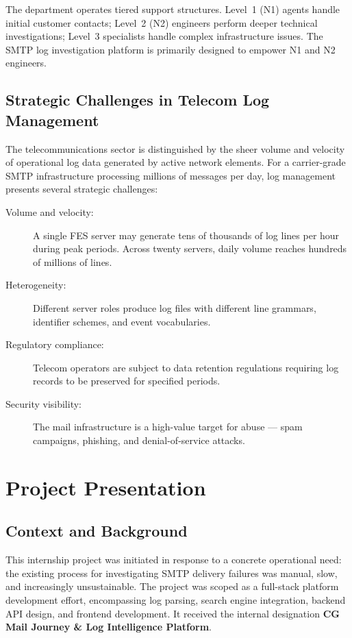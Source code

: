 \documentclass[12pt,a4paper,oneside]{report}
\begin{document}
The department operates tiered support structures.
Level~1 (N1) agents handle initial customer contacts; Level~2 (N2) engineers perform deeper technical investigations; Level~3 specialists handle complex infrastructure issues.
The SMTP log investigation platform is primarily designed to empower N1 and N2 engineers.

\subsection{Strategic Challenges in Telecom Log Management}

The telecommunications sector is distinguished by the sheer volume and velocity of operational log data generated by active network elements.
For a carrier-grade SMTP infrastructure processing millions of messages per day, log management presents several strategic challenges:

\begin{description}
  \item[Volume and velocity:] A single FES server may generate tens of thousands of log lines per hour during peak periods. Across twenty servers, daily volume reaches hundreds of millions of lines.
  \item[Heterogeneity:] Different server roles produce log files with different line grammars, identifier schemes, and event vocabularies.
  \item[Regulatory compliance:] Telecom operators are subject to data retention regulations requiring log records to be preserved for specified periods.
  \item[Security visibility:] The mail infrastructure is a high-value target for abuse --- spam campaigns, phishing, and denial-of-service attacks.
\end{description}

\section{Project Presentation}

\subsection{Context and Background}

This internship project was initiated in response to a concrete operational need: the existing process for investigating SMTP delivery failures was manual, slow, and increasingly unsustainable.
The project was scoped as a full-stack platform development effort, encompassing log parsing, search engine integration, backend API design, and frontend development.
It received the internal designation \textbf{CG Mail Journey \& Log Intelligence Platform}.
\end{document}
